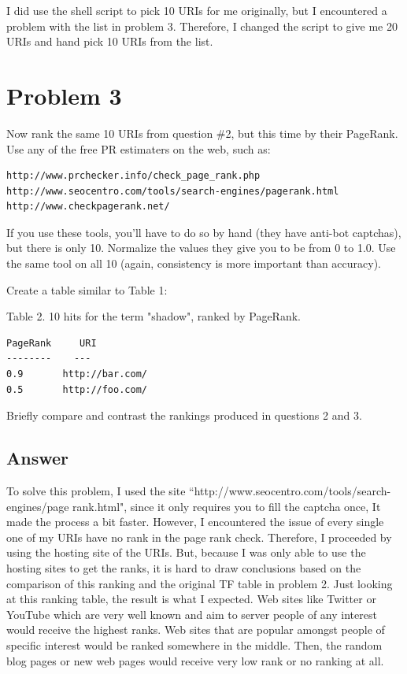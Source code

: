 \documentclass[12pt]{article}
\begin{document}
I did use the shell script to pick 10 URIs for me originally, but I encountered a problem with the list in problem 3. Therefore, I changed the script to give me 20 URIs and hand pick 10 URIs from the list.

\newpage

\section*{Problem 3}
Now rank the same 10 URIs from question \#2, but this time 
by their PageRank.  Use any of the free PR estimaters on the web,
such as:

\begin{verbatim}
http://www.prchecker.info/check_page_rank.php
http://www.seocentro.com/tools/search-engines/pagerank.html
http://www.checkpagerank.net/
\end{verbatim}

If you use these tools, you'll have to do so by hand (they have
anti-bot captchas), but there is only 10.  Normalize the values
they give you to be from 0 to 1.0.  Use the same tool on all 10
(again, consistency is more important than accuracy).

\noindent
Create a table similar to Table 1:

\noindent
Table 2.  10 hits for the term "shadow", ranked by PageRank.

\begin{verbatim}
PageRank	 URI
--------	---
0.9       http://bar.com/
0.5       http://foo.com/
\end{verbatim}

\noindent
Briefly compare and contrast the rankings produced in questions 2
and 3.
\newpage

\subsection*{Answer}
To solve this problem, I used the site ``http://www.seocentro.com/tools/search-engines/page rank.html", since it only requires you to fill the captcha once, It made the process a bit faster. However, I encountered the issue of every single one of my URIs have no rank in the page rank check. Therefore, I proceeded by using the hosting site of the URIs. But, because I was only able to use the hosting sites to get the ranks, it is hard to draw conclusions based on the comparison of this ranking and the original TF table in problem 2. Just looking at this ranking table, the result is what I expected. Web sites like Twitter or YouTube which are very well known and aim to server people of any interest would receive the highest ranks. Web sites that are popular amongst people of specific interest would be ranked somewhere in the middle. Then, the random blog pages or new web pages would receive very low rank or no ranking at all.
\end{document}
